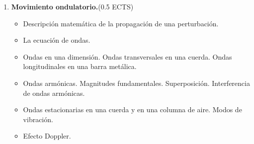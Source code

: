 \begin{enumerate}[{\bf 1. }]
\item {\bf  Movimiento ondulatorio.}\hfill      (0.5 ECTS)
\begin{itemize} \addtolength{\itemsep}{-0.25\baselineskip}
\noindent
\item   Descripci\'{o}n matem\'{a}tica de la propagaci\'{o}n de una perturbaci\'{o}n.
\item La ecuaci\'{o}n de ondas.
\item Ondas en una dimensi\'{o}n. Ondas transversales en una cuerda. Ondas longitudinales en una barra met\'{a}lica.
\item Ondas arm\'{o}nicas. Magnitudes fundamentales. Superposici\'{o}n. Interferencia de ondas arm\'{o}nicas. 
\item Ondas estacionarias en una cuerda y en una columna de aire. Modos de vibraci\'{o}n. 
\item Efecto Doppler. 
\end{itemize}
%



\end{enumerate}

